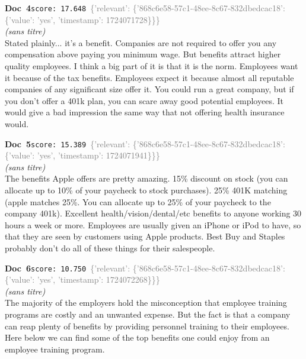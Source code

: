 \documentclass[a4paper,11pt]{article}
\begin{document}
\begin{docenv}
{\footnotesize\textcolor{doccolor}{\textbf{Doc~4}}}\hfill{\tiny\texttt{score:~17.648}}\ {\tiny\textcolor{gray}{\{'relevant': \{'868c6e58-57c1-48ee-8c67-832dbedcac18': \{'value': 'yes', 'timestamp': 1724071728\}\}\}}}\\[3pt]
{\small\textit{(sans titre)}}\\[2pt]
\vspace{2pt}
{\footnotesize 
Stated plainly... it's a benefit. Companies are not required to offer you any compensation above paying you minimum wage. But benefits attract higher quality employees.  I think a big part of it is that it is the norm. Employees want it because of the tax benefits. Employees expect it because almost all reputable companies of any significant size offer it. You could run a great company, but if you don't offer a 401k plan, you can scare away good potential employees. It would give a bad impression the same way that not offering health insurance would.}
\end{docenv}
\begin{docenv}
{\footnotesize\textcolor{doccolor}{\textbf{Doc~5}}}\hfill{\tiny\texttt{score:~15.389}}\ {\tiny\textcolor{gray}{\{'relevant': \{'868c6e58-57c1-48ee-8c67-832dbedcac18': \{'value': 'yes', 'timestamp': 1724071941\}\}\}}}\\[3pt]
{\small\textit{(sans titre)}}\\[2pt]
\vspace{2pt}
{\footnotesize 
The benefits Apple offers are pretty amazing. 15\% discount on stock (you can allocate up to 10\% of your paycheck to stock purchases). 25\% 401K matching (apple matches 25\%. You can allocate up to 25\% of your paycheck to the company 401k). Excellent health/vision/dental/etc benefits to anyone working 30 hours a week or more. Employees are usually given an iPhone or iPod to have, so that they are seen by customers using Apple products.  Best Buy and Staples probably don't do all of these things for their salespeople.}
\end{docenv}
\begin{docenv}
{\footnotesize\textcolor{doccolor}{\textbf{Doc~6}}}\hfill{\tiny\texttt{score:~10.750}}\ {\tiny\textcolor{gray}{\{'relevant': \{'868c6e58-57c1-48ee-8c67-832dbedcac18': \{'value': 'yes', 'timestamp': 1724072268\}\}\}}}\\[3pt]
{\small\textit{(sans titre)}}\\[2pt]
\vspace{2pt}
{\footnotesize 
The majority of the employers hold the misconception that employee training programs are costly and an unwanted expense. But the fact is that a company can reap plenty of benefits by providing personnel training to their employees. Here below we can find some of the top benefits one could enjoy from an employee training program.}
\end{docenv}
\end{document}
